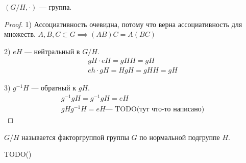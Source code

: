\documentclass[../main.tex]{subfiles}
\begin{document}
\begin{theorem-non}
    $(G / H, \cdot)$ --- группа.
\end{theorem-non}
\begin{proof}
    1) Ассоциативность очевидна, потому что верна ассоциативность для множеств. $A, B, C \subset G \implies (AB)C = A(BC)$

    2) $eH$ --- нейтральный в $G / H$.
    \begin{equation*}
        \begin{gathered}
            gH \cdot eH = gHH = gH\\
            eh \cdot gH = HgH = gHH = gH
        \end{gathered}
    \end{equation*}

    3) $g^{-1}H$ --- обратный к $gH$.
    \begin{equation*}
        \begin{gathered}
            g^{-1}gH = g^{-1}gH = eH \\
            gHg^{-1}H = eH\text{--- TODO(тут что-то написано)}
        \end{gathered}
    \end{equation*}
\end{proof}
\begin{definition}
    $G / H$ называется факторгруппой группы $G$ по нормальной подгруппе $H$.
\end{definition}

\begin{theorem-non}
    TODO()
\end{theorem-non}
\end{document}
